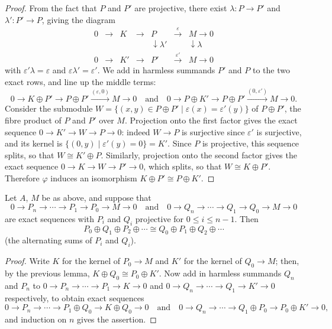 \begin{proof}
From the fact that $P$ and $P'$ are projective, there exist $\lambda\colon P \to P'$
and $\lambda'\colon P' \to P$, giving the diagram
\[
  \begin{array}{ccccccc}
    0 & \to & K & \to & P & \xrightarrow{\varepsilon} & M \to 0 \\
    & & & & \downarrow \lambda' & & \downarrow \lambda \\
    0 & \to & K' & \to & P' & \xrightarrow{\varepsilon'} & M \to 0
  \end{array}
\]
with $\varepsilon'\lambda = \varepsilon$ and $\varepsilon\lambda' = \varepsilon'$.
We add in harmless summands $P'$ and $P$ to the two exact rows, and line
up the middle terms:
\[
  0 \to K \oplus P' \to P \oplus P' \xrightarrow{(\varepsilon, 0)} M \to 0
  \quad \text{and} \quad
  0 \to P \oplus K' \to P \oplus P' \xrightarrow{(0, \varepsilon')} M \to 0.
\]
Consider the submodule $W = \{(x, y) \in P \oplus P' \mid \varepsilon(x) = \varepsilon'(y)\}$ of $P \oplus P'$,
the fibre product of $P$ and $P'$ over $M$. Projection onto the first factor gives
the exact sequence $0 \to K' \to W \to P \to 0$: indeed $W \to P$ is surjective since
$\varepsilon'$ is surjective, and its kernel is $\{(0, y) \mid \varepsilon'(y) = 0\} = K'$. Since $P$ is
projective, this sequence splits, so that $W \cong K' \oplus P$. Similarly, projection onto
the second factor gives the exact sequence $0 \to K \to W \to P' \to 0$, which splits, so
that $W \cong K \oplus P'$. Therefore $\varphi$ induces an isomorphism
$K \oplus P' \cong P \oplus K'$.
\end{proof}

\begin{lemma}\label{lem:19.4}
Let $A$, $M$ be as above, and suppose
that
\[
  0 \to P_n \to \cdots \to P_1 \to P_0 \to M \to 0
  \quad \text{and} \quad
  0 \to Q_n \to \cdots \to Q_1 \to Q_0 \to M \to 0
\]
are exact sequences with $P_i$ and $Q_i$ projective for
$0 \le i \le n - 1$. Then
\[
  P_0 \oplus Q_1 \oplus P_2 \oplus \cdots \cong Q_0 \oplus P_1 \oplus Q_2 \oplus \cdots
\]
(the alternating sums of $P_i$ and $Q_i$).
\end{lemma}

\begin{proof}
Write $K$ for the kernel of $P_0 \to M$ and $K'$ for the kernel of
$Q_0 \to M$; then, by the previous lemma, $K \oplus Q_0 \cong P_0 \oplus K'$. Now add
in harmless summands $Q_n$ and $P_n$ to $0 \to P_n \to \cdots \to P_1 \to
K \to 0$ and $0 \to Q_n \to \cdots \to Q_1 \to K' \to 0$ respectively, to obtain
exact sequences
\[
  0 \to P_n \to \cdots \to P_1 \oplus Q_0 \to K \oplus Q_0 \to 0
  \quad \text{and} \quad
  0 \to Q_n \to \cdots \to Q_1 \oplus P_0 \to P_0 \oplus K' \to 0,
\]
and induction on $n$ gives the assertion.
\end{proof}

